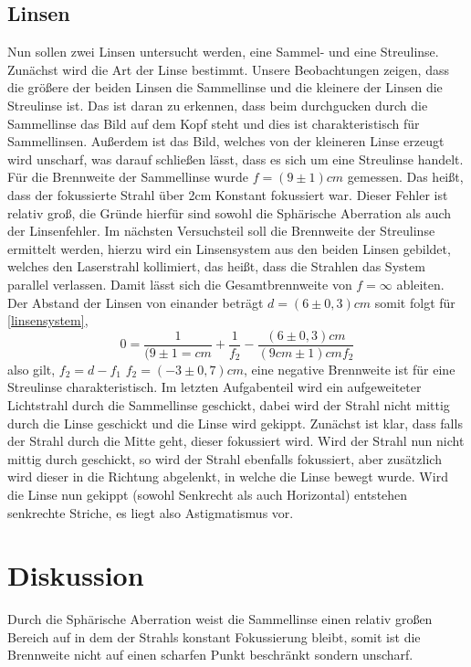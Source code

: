 \subsection{Linsen}
Nun sollen zwei Linsen untersucht werden, eine Sammel- und eine Streulinse. Zunächst wird die Art der Linse bestimmt. Unsere Beobachtungen zeigen, dass die größere der beiden Linsen die Sammellinse und die kleinere der Linsen die Streulinse ist.
Das ist daran zu erkennen, dass beim durchgucken durch die Sammellinse das Bild auf dem Kopf steht und dies ist charakteristisch für Sammellinsen.
Außerdem ist das Bild, welches von der kleineren Linse erzeugt wird unscharf, was darauf schließen lässt, dass es sich um eine Streulinse handelt.
Für die Brennweite der Sammellinse wurde $ f=(9\pm1)\si{cm} $ gemessen. Das heißt, dass der fokussierte Strahl über 2cm Konstant fokussiert war.
Dieser Fehler ist relativ groß, die Gründe hierfür sind sowohl die Sphärische Aberration als auch der Linsenfehler.
Im nächsten Versuchsteil soll die Brennweite der Streulinse ermittelt werden, hierzu wird ein Linsensystem aus den beiden Linsen gebildet, welches den Laserstrahl kollimiert, das heißt, dass die Strahlen das System parallel verlassen.
Damit lässt sich die Gesamtbrennweite von $ f=\infty $ ableiten.
Der Abstand der Linsen von einander beträgt $ d=(6\pm0,3) \si{cm} $ somit folgt für \eqref{linsensystem},
\begin{equation}
0=\frac{1}{(9\pm1=\si{cm}}+\frac{1}{f_{2}}-\frac{(6\pm0,3)\si{cm}}{(9cm\pm1)\si{cm} f_{2}}
\end{equation}
also gilt, $ f_{2}=d-f_{1} $ \Rightarrow $ f_{2}=(-3\pm0,7) \si{cm} $, eine negative Brennweite ist für eine Streulinse charakteristisch.
Im letzten Aufgabenteil wird ein aufgeweiteter Lichtstrahl durch die Sammellinse geschickt, dabei wird der Strahl nicht mittig durch die Linse geschickt und die Linse wird gekippt.
Zunächst ist klar, dass falls der Strahl durch die Mitte geht, dieser fokussiert wird.
Wird der Strahl nun nicht mittig durch geschickt, so wird der Strahl ebenfalls fokussiert, aber zusätzlich wird dieser in die Richtung abgelenkt, in welche die Linse bewegt wurde.
Wird die Linse nun gekippt (sowohl Senkrecht als auch Horizontal) entstehen senkrechte Striche, es liegt also Astigmatismus vor.




\newpage
\section{Diskussion} 
Durch die Sphärische Aberration weist die Sammellinse einen relativ großen Bereich auf in dem der  Strahls konstant Fokussierung bleibt, somit ist die Brennweite nicht auf einen scharfen Punkt beschränkt sondern unscharf. 

